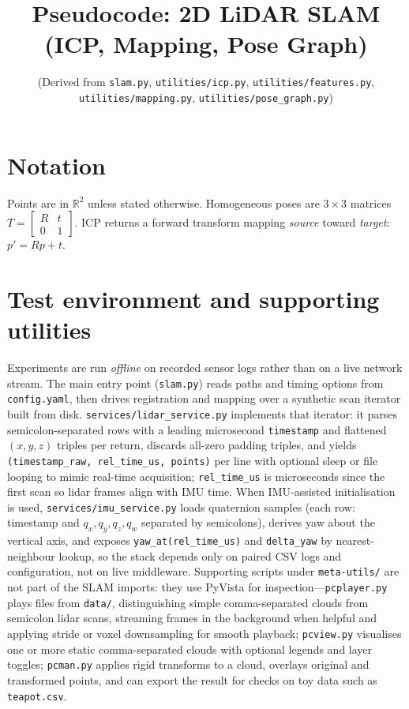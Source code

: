 \documentclass[11pt,a4paper]{article}
\title{Pseudocode: 2D LiDAR SLAM (ICP, Mapping, Pose Graph)}
\author{(Derived from \texttt{slam.py}, \texttt{utilities/icp.py}, \texttt{utilities/features.py}, \texttt{utilities/mapping.py}, \texttt{utilities/pose\_graph.py})}
\date{}
\begin{document}
\maketitle

\section*{Notation}
Points are in $\mathbb{R}^2$ unless stated otherwise.
Homogeneous poses are $3 \times 3$ matrices $T = \begin{bmatrix} R & t \\ 0 & 1 \end{bmatrix}$.
ICP returns a forward transform mapping \emph{source} toward \emph{target}: $p' = R p + t$.

\section{Test environment and supporting utilities}

Experiments are run \emph{offline} on recorded sensor logs rather than on a live network stream. The main entry point (\texttt{slam.py}) reads paths and timing options from \texttt{config.yaml}, then drives registration and mapping over a synthetic scan iterator built from disk. \texttt{services/lidar\_service.py} implements that iterator: it parses semicolon-separated rows with a leading microsecond \texttt{timestamp} and flattened $(x,y,z)$ triples per return, discards all-zero padding triples, and yields \texttt{(timestamp\_raw,\,rel\_time\_us,\,points)} per line with optional sleep or file looping to mimic real-time acquisition; \texttt{rel\_time\_us} is microseconds since the first scan so lidar frames align with IMU time. When IMU-assisted initialisation is used, \texttt{services/imu\_service.py} loads quaternion samples (each row: timestamp and $q_x, q_y, q_z, q_w$ separated by semicolons), derives yaw about the vertical axis, and exposes \texttt{yaw\_at(rel\_time\_us)} and \texttt{delta\_yaw} by nearest-neighbour lookup, so the stack depends only on paired CSV logs and configuration, not on live middleware. Supporting scripts under \texttt{meta-utils/} are not part of the SLAM imports: they use PyVista for inspection---\texttt{pcplayer.py} plays files from \texttt{data/}, distinguishing simple comma-separated clouds from semicolon lidar scans, streaming frames in the background when helpful and applying stride or voxel downsampling for smooth playback; \texttt{pcview.py} visualises one or more static comma-separated clouds with optional legends and layer toggles; \texttt{pcman.py} applies rigid transforms to a cloud, overlays original and transformed points, and can export the result for checks on toy data such as \texttt{teapot.csv}.
\end{document}
